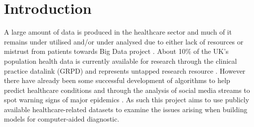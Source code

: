 \chapter{Introduction}\label{ch:Introduction}
 \setcounter{page}{1}

A large amount of data is produced in the healthcare sector \citep{EMC:2014ve} and much of it remains under utilised and/or under analysed due to either lack of resources \citep{Raghupathi:2014ek} or mistrust from patients towards Big Data project \citep{Goldacre:tf,bcs:2017tl}. About 10\% of the UK's population health data is currently available for research through the clinical practice datalink (GRPD) and represents untapped research resource \citep{Kousoulis:2015ti}. However there have already been some successful development of algorithms to help predict healthcare conditions \citep{Bellon:2013um} and through the analysis of social media streams to spot warning signs of major epidemics \citep{Kostkova:2016ur}.\newline
As such this project aims to use publicly available healthcare-related datasets to examine the issues arising when building models for computer-aided diagnostic.\newline

